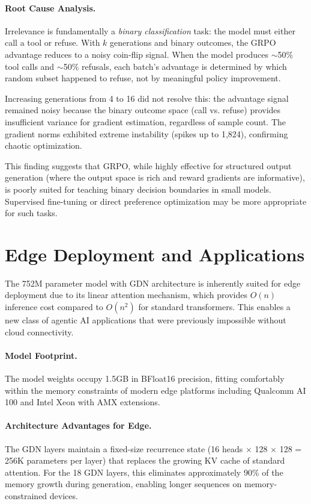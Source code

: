 \documentclass[10pt,twocolumn]{article}
\begin{document}
\paragraph{Root Cause Analysis.}
Irrelevance is fundamentally a \textit{binary classification} task: the model must either call a tool or refuse. With $k$ generations and binary outcomes, the GRPO advantage reduces to a noisy coin-flip signal. When the model produces $\sim$50\% tool calls and $\sim$50\% refusals, each batch's advantage is determined by which random subset happened to refuse, not by meaningful policy improvement.

Increasing generations from 4 to 16 did not resolve this: the advantage signal remained noisy because the binary outcome space (call vs. refuse) provides insufficient variance for gradient estimation, regardless of sample count. The gradient norms exhibited extreme instability (spikes up to 1,824), confirming chaotic optimization.

This finding suggests that GRPO, while highly effective for structured output generation (where the output space is rich and reward gradients are informative), is poorly suited for teaching binary decision boundaries in small models. Supervised fine-tuning or direct preference optimization may be more appropriate for such tasks.

\section{Edge Deployment and Applications}

The 752M parameter model with GDN architecture is inherently suited for edge deployment due to its linear attention mechanism, which provides $O(n)$ inference cost compared to $O(n^2)$ for standard transformers. This enables a new class of agentic AI applications that were previously impossible without cloud connectivity.

\paragraph{Model Footprint.} The model weights occupy 1.5GB in BFloat16 precision, fitting comfortably within the memory constraints of modern edge platforms including Qualcomm AI 100 and Intel Xeon with AMX extensions.

\paragraph{Architecture Advantages for Edge.} The GDN layers maintain a fixed-size recurrence state (16 heads $\times$ 128 $\times$ 128 = 256K parameters per layer) that replaces the growing KV cache of standard attention. For the 18 GDN layers, this eliminates approximately 90\% of the memory growth during generation, enabling longer sequences on memory-constrained devices.
\end{document}
